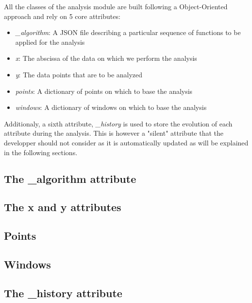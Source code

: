 All the classes of the analysis module are built following a Object-Oriented approach and rely on 5 core attributes:
\begin{itemize}
    \item \textit{\_algorithm}: A JSON file describing a particular sequence of functions to be applied for the analysis
    \item \textit{x}: The abscissa of the data on which we perform the analysis
    \item \textit{y}: The data points that are to be analyzed
    \item \textit{points}: A dictionary of points on which to base the analysis
    \item \textit{windows}: A dictionary of windows on which to base the analysis
\end{itemize}

Additionaly, a sixth attribute, \textit{\_history} is used to store the evolution of each attribute during the analysis. This is however a "silent" attribute that the developper should not consider as it is automatically updated as will be explained in the following sections.


\subsection{The \_algorithm attribute} \label{subsec:analysis.attributes.algorithm}
    

\subsection{The x and y attributes} \label{subsec:analysis.attributes.x_and_y}
    

\subsection{Points} \label{subsec:analysis.attributes.points}
    

\subsection{Windows} \label{subsec:analysis.attributes.windows}
    

\subsection{The \_history attribute} \label{subsec:analysis.attributes.history}
    
